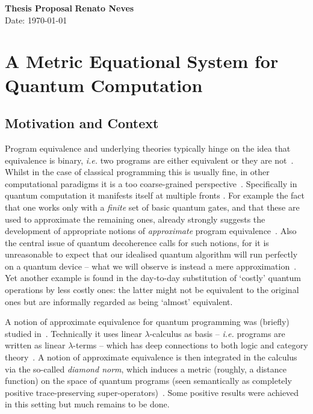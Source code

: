 \documentclass[a4paper, 11pt]{article}
\begin{document}
\noindent
\large\textbf{Thesis Proposal} \hfill \textbf{Renato Neves} \\
Date: \today

\section*{A Metric Equational System for Quantum Computation}

\subsection*{Motivation and Context}

Program equivalence and underlying theories typically hinge on the idea that
equivalence is binary, \emph{i.e.} two programs are either equivalent or they
are not~\cite{winskel93}. Whilst in the case of classical programming this is
usually fine, in other computational paradigms it is a too coarse-grained
perspective~\cite{dahlqvist23b}.  Specifically in quantum computation it
manifests itself at multiple fronts \cite{han19,dahlqvist23b,watrous18}. For example
the fact that one works only with a \emph{finite} set of basic quantum gates, and that
these are used to approximate the remaining ones, already strongly suggests the
development of appropriate notions of \emph{approximate} program
equivalence~\cite{dahlqvist23b}. Also the central issue of quantum decoherence
calls for such notions, for it is unreasonable to expect that our idealised
quantum algorithm will run perfectly on a quantum device --  what we will
observe is instead a mere approximation~\cite{han19,preskill18}.  Yet another
example is found in the day-to-day substitution of `costly' quantum operations
by less costly ones: the latter might not be equivalent to the original ones
but are informally regarded as being `almost' equivalent.

A notion of approximate equivalence for quantum programming was (briefly)
studied in~\cite{dahlqvist23}. Technically it uses linear $\lambda$-calculus as
basis -- \emph{i.e.} programs are written as linear $\lambda$-terms -- which has
 deep connections to both logic and category
theory~\cite{girard95,benton94}. A notion of approximate equivalence is then
integrated in the calculus via the so-called \emph{diamond norm}, which induces a
metric (roughly, a distance function) on the space of quantum programs (seen
semantically as completely positive trace-preserving
super-operators)~\cite{watrous18}. Some positive results were achieved in this
setting but much remains to be done.
\end{document}
